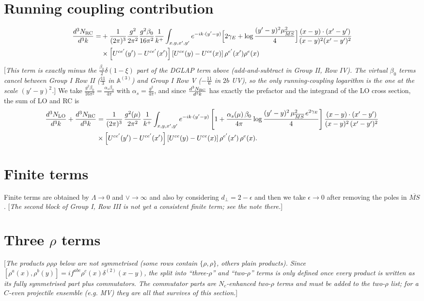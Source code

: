 \documentclass[9pt]{article}
\def\mf#1{\mathbb{#1}}
\newcommand{\chg}[1]{{\color{red}#1}}
\newcommand{\rnote}[1]{{\color{teal}[\textit{#1}]}}
\numberwithin{equation}{section}
\begin{document}
\section{Running coupling contribution}
\begin{align}
\frac{d^{3}N_{\rm RC}}{d^{3}k}= & +\frac{1}{(2\pi)^{3}}\frac{g^{2}}{2\pi^{2}}\frac{g^{2}\beta_{0}}{16\pi^{2}}\frac{1}{k^{+}}\int_{x,y,x',y'}e^{-ik\cdot(y'-y)}\Big[2\gamma_{E}+\log\frac{(y'-y)^{2}\mu^{2}_{\overline{MS}}}{4}\Big]\frac{(x-y)\cdot(x'-y')}{(x-y)^{2}(x'-y')^{2}}\notag\\
&\times\left[U^{ce'}(y') - U^{ce'}(x')\right]\left[U^{ce}(y) - U^{ce}(x)\right]\rho^{e'}(x')\rho^{e}(x)
\end{align}
\rnote{This term is exactly minus the $\frac{\beta_{0}}{2}\delta(1-\xi)$ part of the DGLAP term above (add-and-subtract in Group II, Row IV). The virtual $\beta_{0}$ terms cancel between Group I Row II ($\frac{11}{3}$ in $\mf{A}^{(3)}$) and Group I Row V ($-\frac{11}{6}$ in $2b$ UV), so the only running-coupling logarithm is the one at the scale $(y'-y)^{2}$.}
We take $\frac{g^{2}\beta_{0}}{16\pi^{2}}=\frac{\alpha_{s}\beta_{0}}{4\pi}$ with $\alpha_{s}=\frac{g^{2}}{4\pi}$, and since $\frac{d^{3}N_{\rm RC}}{d^{3}k}$ has exactly the prefactor and the integrand of the LO cross section, the sum of LO and RC is
\begin{align}
\frac{d^{3}N_{\rm LO}}{d^{3}k}+\frac{d^{3}N_{\rm RC}}{d^{3}k}&=\frac{1}{(2\pi)^{3}}\,\frac{g^{2}(\mu)}{2\pi^{2}}\,\frac{1}{k^{+}}\int_{x,y,x',y'}e^{-ik\cdot(y'-y)}\left[1+\frac{\alpha_{s}(\mu)\,\beta_{0}}{4\pi}\log\frac{(y'-y)^{2}\,\mu^{2}_{\overline{MS}}\,e^{2\gamma_{E}}}{4}\right]\frac{(x-y)\cdot(x'-y')}{(x-y)^{2}\,(x'-y')^{2}}\notag\\
&\times\left[U^{ce'}(y')-U^{ce'}(x')\right]\left[U^{ce}(y)-U^{ce}(x)\right]\rho^{e'}(x')\,\rho^{e}(x).
\end{align}
\section{Finite terms}
Finite terms are obtained by $\Lambda \to 0$ and $\vee\to \infty $ and also by considering $d_{\perp} = 2-\epsilon$ and then we take $\epsilon \to 0$ \chg{after removing the poles in $\overline{MS}$.}
\rnote{The second block of Group I, Row III is not yet a consistent finite term; see the note there.}
\section*{Three $\rho$ terms}
\rnote{The products $\rho\rho\rho$ below are not symmetrised (some rows contain $\{\rho,\rho\}$, others plain products). Since $[\rho^{a}(x),\rho^{b}(y)]=if^{abc}\rho^{c}(x)\delta^{(2)}(x-y)$, the split into ``three-$\rho$'' and ``two-$\rho$'' terms is only defined once every product is written as its fully symmetrised part plus commutators. The commutator parts are $N_{c}$-enhanced two-$\rho$ terms and must be added to the two-$\rho$ list; for a $C$-even projectile ensemble (e.g. MV) they are all that survives of this section.}
\end{document}
